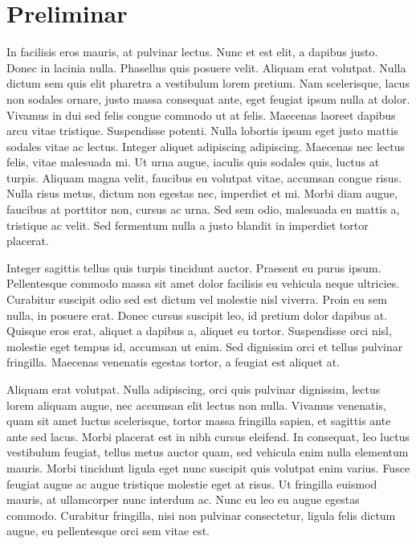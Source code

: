 \documentclass[twoside]{ritsi/report}
\begin{document}

\section{Preliminar}

In facilisis eros mauris, at pulvinar lectus. Nunc et est elit, a dapibus justo. Donec in lacinia nulla. Phasellus quis posuere velit. Aliquam erat volutpat. Nulla dictum sem quis elit pharetra a vestibulum lorem pretium. Nam scelerisque, lacus non sodales ornare, justo massa consequat ante, eget feugiat ipsum nulla at dolor. Vivamus in dui sed felis congue commodo ut at felis. Maecenas laoreet dapibus arcu vitae tristique. 
Suspendisse potenti. Nulla lobortis ipsum eget justo mattis sodales vitae ac lectus. Integer aliquet adipiscing adipiscing. Maecenas nec lectus felis, vitae malesuada mi. Ut urna augue, iaculis quis sodales quis, luctus at turpis. Aliquam magna velit, faucibus eu volutpat vitae, accumsan congue risus. Nulla risus metus, dictum non egestas nec, imperdiet et mi. Morbi diam augue, faucibus at porttitor non, cursus ac urna. Sed sem odio, malesuada eu mattis a, tristique ac velit. Sed fermentum nulla a justo blandit in imperdiet tortor placerat.

Integer sagittis tellus quis turpis tincidunt auctor. Praesent eu purus ipsum. Pellentesque commodo massa sit amet dolor facilisis eu vehicula neque ultricies. Curabitur suscipit odio sed est dictum vel molestie nisl viverra. Proin eu sem nulla, in posuere erat. Donec cursus suscipit leo, id pretium dolor dapibus at. Quisque eros erat, aliquet a dapibus a, aliquet eu tortor. Suspendisse orci nisl, molestie eget tempus id, accumsan ut enim. Sed dignissim orci et tellus pulvinar fringilla. Maecenas venenatis egestas tortor, a feugiat est aliquet at.

Aliquam erat volutpat. Nulla adipiscing, orci quis pulvinar dignissim, lectus lorem aliquam augue, nec accumsan elit lectus non nulla. Vivamus venenatis, quam sit amet luctus scelerisque, tortor massa fringilla sapien, et sagittis ante ante sed lacus. Morbi placerat est in nibh cursus eleifend. In consequat, leo luctus vestibulum feugiat, tellus metus auctor quam, sed vehicula enim nulla elementum mauris. Morbi tincidunt ligula eget nunc suscipit quis volutpat enim varius. Fusce feugiat augue ac augue tristique molestie eget at risus. Ut fringilla euismod mauris, at ullamcorper nunc interdum ac. Nunc eu leo eu augue egestas commodo. Curabitur fringilla, nisi non pulvinar consectetur, ligula felis dictum augue, eu pellentesque orci sem vitae est.
\end{document}
